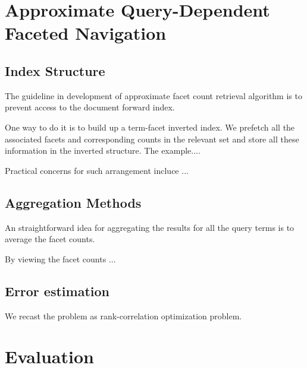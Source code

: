 \section{Approximate Query-Dependent Faceted Navigation}

\subsection{Index Structure} 
The guideline in development of approximate facet count retrieval algorithm is
to prevent access to the document forward index.  

One way to do it is to build up a term-facet inverted index.  We prefetch all
the associated facets and corresponding counts in the relevant set and store
all these information in the inverted structure.  The example.... 

Practical concerns for such arrangement incluce ... 

\subsection{Aggregation Methods}

An straightforward idea for aggregating the results for all the query terms is
to average the facet counts. 

By viewing the facet counts ... 


\subsection{Error estimation} 
We recast the problem as rank-correlation optimization problem.  


\section{Evaluation}

